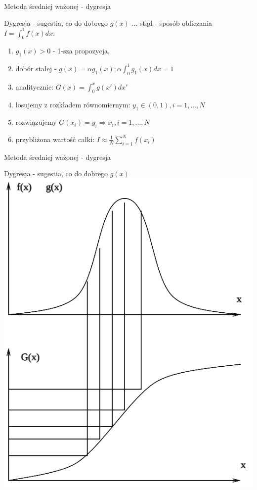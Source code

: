 \begin{frame}{Metoda średniej ważonej - dygresja}
	\begin{block}{Dygresja - sugestia, co do dobrego $g(x)$}
    	... stąd - sposób obliczania $I = \int_0^1 f(x) dx$:
        \begin{enumerate}
        	\item $g_1(x) > 0$ - 1-sza propozycja,
            \item dobór stałej - $g(x) = \alpha g_1(x); \alpha \int_0^1 g_1(x) dx = 1$
            \item analitycznie: $G(x) = \int_0^x g(x') dx'$
            \item losujemy z rozkładem równomiernym: $y_1 \in (0, 1), i = 1, ..., N$
            \item rozwiązujemy $G(x_i) = y_i \Rightarrow x_i, i = 1, ..., N$
            \item przybliżona wartość całki: $I \approx \frac{1}{N} \sum_{i=1}^N f(x_i)$
        \end{enumerate}
	\end{block}
\end{frame}
\begin{frame}{Metoda średniej ważonej - dygresja}
	\begin{block}{Dygresja - sugestia, co do dobrego $g(x)$}
    	\centering \includegraphics[width=.4\linewidth]{img/15/15_2_dobre_gx}
	\end{block}
\end{frame}